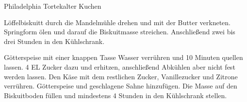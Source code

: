 \begin{recipe}{Philadelphia Torte}{kalter Kuchen}
  \label{Philadelphia Torte}

  \steps
  Löffelbiskuitt durch die Mandelmühle drehen und mit der Butter verkneten. Springform
  ölen und darauf die Biskuitmasse streichen. Anschließend zwei bis drei Stunden in den
  Kühlschrank.

  Götterspeise mit einer knappen Tasse Wasser verrühren und 10 Minuten quellen lassen.
  4 EL Zucker dazu und erhitzen, anschließend Abkühlen aber nicht fest werden lassen. Den
  Käse mit dem restlichen Zucker, Vanillezucker und Zitrone verrühren. Götterspeise und
  geschlagene Sahne hinzufügen. Die Masse auf den Biskuitboden füllen und mindestens 4
  Stunden in den Kühlschrank stellen.
\end{recipe}
